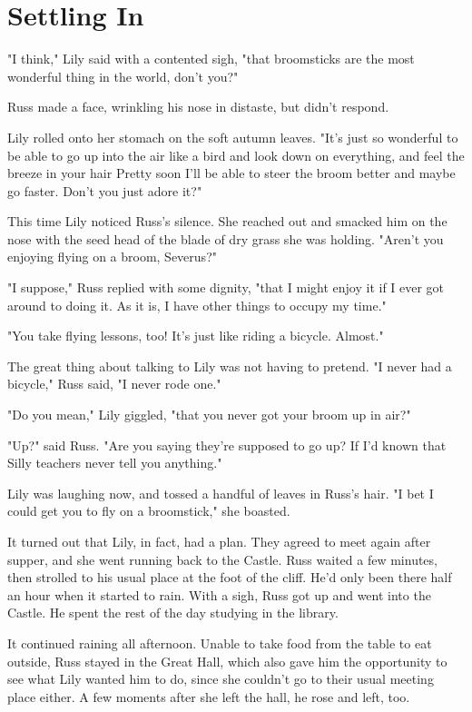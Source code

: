 
\chapter{Settling In}

"I think," Lily said with a contented sigh, "that broomsticks are the most wonderful thing in the world, don't you?"

Russ made a face, wrinkling his nose in distaste, but didn't respond.

Lily rolled onto her stomach on the soft autumn leaves. "It's just so wonderful to be able to go up into the air like a bird and look down on everything, and feel the breeze in your hair{\el} Pretty soon I'll be able to steer the broom better and maybe go faster. Don't you just adore it?"

This time Lily noticed Russ's silence. She reached out and smacked him on the nose with the seed head of the blade of dry grass she was holding. "Aren't you enjoying flying on a broom, Severus?"

"I suppose," Russ replied with some dignity, "that I might enjoy it if I ever got around to doing it. As it is, I have other things to occupy my time."

"You take flying lessons, too! It's just like riding a bicycle. Almost."

The great thing about talking to Lily was not having to pretend. "I never had a bicycle," Russ said, "I never rode one."

"Do you mean," Lily giggled, "that you never got your broom up in air?"

"Up?" said Russ. "Are you saying they're supposed to go up? If I'd known that{\el} Silly teachers never tell you anything."

Lily was laughing now, and tossed a handful of leaves in Russ's hair. "I bet I could get you to fly on a broomstick," she boasted.

It turned out that Lily, in fact, had a plan. They agreed to meet again after supper, and she went running back to the Castle. Russ waited a few minutes, then strolled to his usual place at the foot of the cliff. He'd only been there half an hour when it started to rain. With a sigh, Russ got up and went into the Castle. He spent the rest of the day studying in the library.

It continued raining all afternoon. Unable to take food from the table to eat outside, Russ stayed in the Great Hall, which also gave him the opportunity to see what Lily wanted him to do, since she couldn't go to their usual meeting place either. A few moments after she left the hall, he rose and left, too.

